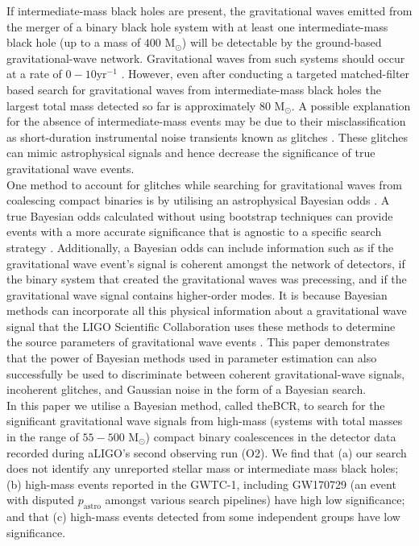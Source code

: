 \documentclass[%
 reprint,
 amsmath,amssymb,
 aps,
]{revtex4}
\newcommand{\bcr}{{\sc BCR}\xspace}
\newcommand{\msun}{{M${}_\odot$}\xspace}
\begin{document}
If intermediate-mass black holes are present, the gravitational waves emitted from the merger of a binary black hole system with at least one intermediate-mass black hole (up to a mass of $400$ \msun) will be detectable by the ground-based gravitational-wave network. Gravitational waves from such systems should occur at a rate of $0-10\text{yr}^{-1}$ \cite{fregeau2006imbhbRatePrediction, mandel2008rates,rodriguez2015bbhRatePredictions}.  However, even after conducting a targeted matched-filter based search for gravitational waves from intermediate-mass black holes the largest total mass detected so far is approximately $80$ \msun \cite{imbhbSearch2014, ligo_imbh_search, abbott2019gwtc}. A possible explanation for the absence of intermediate-mass events may be due to their misclassification as short-duration instrumental noise transients known as glitches \cite{glitch_in_fifth_ligo_run, bayeswave, improving_dq_in_early_runs, ligo_glitch_gw150914, pycbc_short_duration_transients, pe_with_glitch, blip_glitches}. These glitches can mimic astrophysical signals and hence decrease the significance of true gravitational wave events. \\


One method to account for glitches while searching for gravitational waves from coalescing compact binaries is by utilising an astrophysical Bayesian odds  \cite{bci, BCR1, BCR2, bcr_gw151216, bayesian_odds}. A true Bayesian odds calculated without using bootstrap techniques can provide events with a more accurate significance that is agnostic to a specific search strategy \cite{BCR2, bcr_gw151216,  bayesian_odds}. Additionally, a Bayesian odds can include information such as if the gravitational wave event's signal is coherent amongst the network of detectors, if the binary system that created the gravitational waves was precessing, and if the gravitational wave signal contains higher-order modes.  It is because Bayesian methods can incorporate all this physical information about a gravitational wave signal that the LIGO Scientific Collaboration uses these methods to determine the source parameters of gravitational wave events \cite{abbott2016ligo, abbott2019gwtc}. This paper demonstrates that the power of Bayesian methods used in parameter estimation can also successfully be used to discriminate between coherent gravitational-wave signals, incoherent glitches, and Gaussian noise in the form of a Bayesian search. \\

 In this paper we utilise a Bayesian method, called the\bcr \cite{BCR1}, to search for the significant gravitational wave signals from high-mass (systems with total masses in the range of $55-500$ \msun) compact binary coalescences in the detector data recorded during aLIGO's second observing run (O2).  We find that (a) our search does not identify any unreported stellar mass or intermediate mass black holes; (b) high-mass events reported in the GWTC-1, including GW170729 (an event with disputed $p_\text{astro}$ amongst various search pipelines) have high low significance; and that (c) high-mass events detected from some independent groups have low significance. \\
\end{document}
